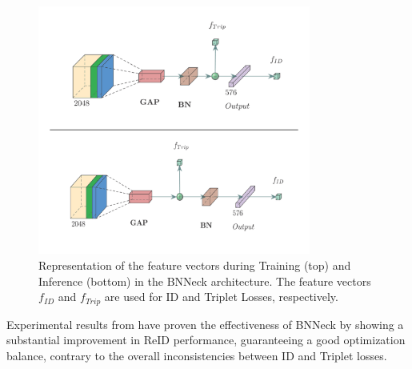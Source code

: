 \begin{figure}[H]
    \centering
    \includegraphics[width=0.80\textwidth]{images/Losses.png}
    \caption[Training and Inference representation]{Representation of the feature vectors during Training (top) and Inference (bottom) in the BNNeck architecture. The feature vectors $f_{ID}$ and $f_{Trip}$ are used for ID and Triplet Losses, respectively.}
    \label{fig:Losses}
\end{figure}

Experimental results from \cite{StrongBaselineBatchNorm} have proven the effectiveness of BNNeck by showing a substantial improvement in ReID performance, guaranteeing a good optimization balance, contrary to the overall inconsistencies between ID and Triplet losses.


